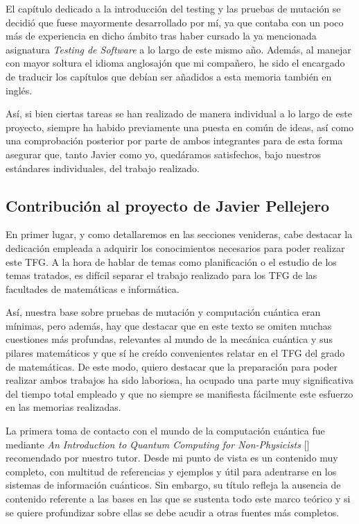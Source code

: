 El capítulo dedicado a la introducción del testing y las pruebas de mutación se decidió que fuese mayormente desarrollado por mí, ya que contaba con un poco más de experiencia en dicho ámbito tras haber cursado la ya mencionada asignatura \textit{Testing de Software} a lo largo de este mismo año. Además, al manejar con mayor soltura el idioma anglosajón que mi compañero, he sido el encargado de traducir los capítulos que debían ser añadidos a esta memoria también en inglés.

Así, si bien ciertas tareas se han realizado de manera individual a lo largo de este proyecto, siempre ha habido previamente una puesta en común de ideas, así como una comprobación posterior por parte de ambos integrantes para de esta forma asegurar que, tanto Javier como yo, quedáramos satisfechos, bajo nuestros estándares individuales, del trabajo realizado.

\subsection{Contribución al proyecto de Javier Pellejero}

En primer lugar, y como detallaremos en las secciones venideras, cabe destacar la dedicación empleada a adquirir los conocimientos necesarios para poder realizar este TFG. A la hora de hablar de temas como planificación o el estudio de los temas tratados, es difícil separar el trabajo realizado para los TFG de las facultades de matemáticas e informática.

Así, nuestra base sobre pruebas de mutación y computación cuántica eran mínimas, pero además, hay que destacar que en este texto se omiten muchas cuestiones más profundas, relevantes al mundo de la mecánica cuántica y sus pilares matemáticos y que sí he creído convenientes relatar en el TFG del grado de matemáticas. De este modo, quiero destacar que la preparación para poder realizar ambos trabajos ha sido laboriosa, ha ocupado una parte muy significativa del tiempo total empleado y que no siempre se manifiesta fácilmente este esfuerzo en las memorias realizadas.

La primera toma de contacto con el mundo de la computación cuántica fue mediante \textit{An Introduction to Quantum Computing for Non-Physicists} [\cite{rieffel2000introduction}] recomendado por nuestro tutor. Desde mi punto de vista es un contenido muy completo, con multitud de referencias y ejemplos y útil para adentrarse en los sistemas de información cuánticos. Sin embargo, su título refleja la ausencia de contenido referente a las bases en las que se sustenta todo este marco teórico y si se quiere profundizar sobre ellas se debe acudir a otras fuentes más completos.

